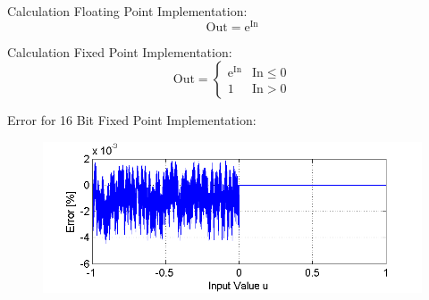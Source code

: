 %
%
%
%
%
%
%
%
Calculation Floating Point Implementation:
\begin{equation*}
	\mathrm{Out}
		=
		\mathrm{e}^{\mathrm{In}}
\end{equation*}

Calculation Fixed Point Implementation:
\begin{equation*}
	\mathrm{Out}
		=
	\begin{cases}
		\mathrm{e}^{\mathrm{In}} & \mathrm{In} \le 0
		\\
		1 & \mathrm{In} > 0
	\end{cases}
\end{equation*}



Error for 16 Bit Fixed Point Implementation:
\begin{figure}[H]
	\includegraphics[width=\textwidth]{Exp_Error}
\end{figure}
